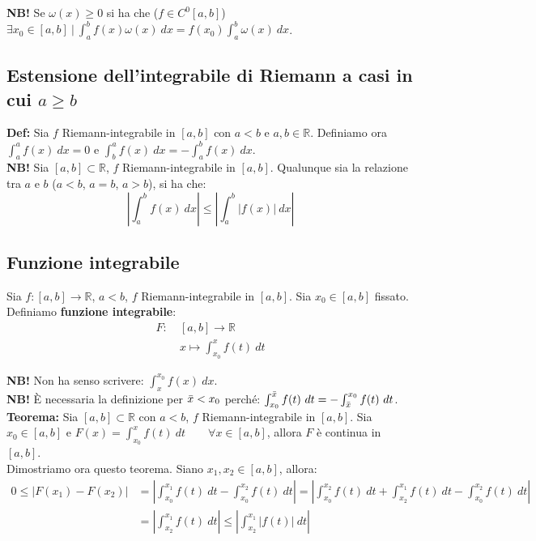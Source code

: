 \documentclass{article}
\begin{document}
\noindent\textbf{NB!} Se $\omega(x) \geq 0$ si ha che ($f \in C^0[a, b]$) $\exists x_0 \in [a, b] \ | \ \int_a^b f(x) \omega(x) \ dx = f(x_0) \int_a^b \omega(x) \ dx$.

\subsection{Estensione dell'integrabile di Riemann a casi in cui $a \geq b$}
\textbf{Def:} Sia $f$ Riemann-integrabile in $[a, b]$ con $a < b$ e $a, b \in \mathbb{R}$. Definiamo ora $\int_a^a f(x) \ dx = 0$ e $\int_b^a f(x) \ dx = - \int_a^b f(x) \ dx$.\\

\noindent\textbf{NB!} Sia $[a, b] \subset \mathbb{R}$, $f$ Riemann-integrabile in $[a, b]$. Qualunque sia la relazione tra $a$ e $b$ ($a < b$, $a = b$, $a > b$), si ha che:
\begin{equation*}
    \left|\int_a^b f(x) \ dx \right| \leq \left|\int_a^b |f(x)| \ dx \right|
\end{equation*}

\subsection{Funzione integrabile}
Sia $f: [a, b] \xrightarrow{} \mathbb{R}$, $a < b$, $f$ Riemann-integrabile in $[a, b]$. Sia $x_0 \in [a, b]$ fissato. Definiamo \textbf{funzione integrabile}:
\begin{align*}
    F: \ & [a, b] \xrightarrow{} \mathbb{R}\\
    & x \longmapsto \int_{x_0}^x f(t) \ dt
\end{align*}

\noindent\textbf{NB!} Non ha senso scrivere: $\int_x^{x_0} f(x) \ dx$.\\

\noindent\textbf{NB!} È necessaria la definizione per $\Bar{x} < x_0$ perché: $\int_{x_0}^{\Bar{x}} f(t) \ dt = - \int_{\Bar{x}}^{x_0} f(t) \ dt$.\\

\noindent\textbf{Teorema:} Sia $[a, b] \subset \mathbb{R}$ con $a < b$, $f$ Riemann-integrabile in $[a, b]$. Sia $x_0 \in [a, b]$ e $F(x) = \int_{x_0}^x f(t) \ dt \qquad \forall x \in [a, b]$, allora $F$ è continua in $[a, b]$.\\

\noindent Dimostriamo ora questo teorema. Siano $x_1, x_2 \in [a, b]$, allora:
\begin{align*}
    0 \leq |F(x_1) - F(x_2)| &= \left|\int_{x_0}^{x_1} f(t) \ dt - \int_{x_0}^{x_2} f(t) \ dt\right| = \left|\int_{x_0}^{x_2} f(t) \ dt + \int_{x_2}^{x_1} f(t) \ dt - \int_{x_0}^{x_2} f(t) \ dt\right| \\
    &= \left|\int_{x_2}^{x_1} f(t) \ dt\right| \leq \left|\int_{x_2}^{x_1}|f(t)| \ dt\right|
\end{align*}
\end{document}
